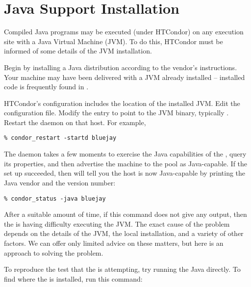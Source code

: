 \section{Java Support Installation}\label{sec:java-install}


Compiled Java programs may be executed (under HTCondor) on
any
execution site with a
Java Virtual Machine (JVM).
To do this,
HTCondor must be informed of some details of the
JVM installation.

Begin by installing a Java distribution according to the vendor's
instructions.
Your machine may have
been delivered with a JVM already installed -- installed code
is frequently found in .

HTCondor's configuration includes the location of the installed
JVM.
Edit the configuration file.
Modify the  entry to point to the JVM binary,
typically .
Restart the  daemon on that host.  For example,

\begin{verbatim}
% condor_restart -startd bluejay
\end{verbatim}

The  daemon takes a few moments to exercise the Java
capabilities of the , query its properties,
and then advertise the machine
to the pool as Java-capable.
If the set up succeeded, then  will
tell you the host is now Java-capable by printing the Java
vendor and the version number:

\begin{verbatim}
% condor_status -java bluejay
\end{verbatim}

After a suitable amount of time, if this command does not give any output,
then the   is having difficulty executing the JVM.
The exact cause of the problem depends on the details of the
JVM, the local installation, and a variety of other factors.
We can offer only limited advice on these matters,
but here is an approach to solving the problem.

To reproduce the test that the  is attempting,
try running the Java  directly.  To find
where the  is installed, run this command:

